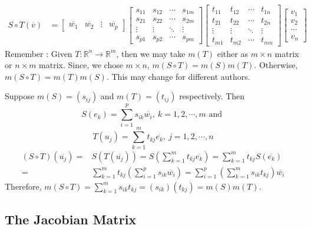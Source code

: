 \begin{commentary}
\begin{align*}
	S \circ T(\overline{v}) & = \begin{bmatrix} \overline{w_1} & \overline{w_2} & \vdots & \overline{w_p} \end{bmatrix} \begin{bmatrix} s_{11} & s_{12} & \cdots & s_{1m} \\ s_{21} & s_{22} & \cdots & s_{2m} \\ \vdots & \vdots & \ddots & \vdots \\ s_{p1} & s_{p2} & \cdots & s_{pm} \end{bmatrix} \begin{bmatrix} t_{11} & t_{12} & \cdots & t_{1n} \\ t_{21} & t_{22} & \cdots & t_{2n} \\ \vdots & \vdots & \ddots & \vdots \\ t_{m1} & t_{m2} & \cdots & t_{mn} \end{bmatrix} \begin{bmatrix} v_1 \\ v_2 \\ \cdots \\ v_n  \end{bmatrix} 
\end{align*}
	Remember : Given $T : \mathbb{R}^n \to \mathbb{R}^m$, then we may take $m(T)$ either as $m \times n$ matrix or $n \times m$ matrix. Since, we chose $m \times n$, $m(S \circ T) = m(S)m(T)$. Otherwise, $m(S \circ T) = m(T)m(S)$. This may change for different authors.\\
\end{commentary}

	Suppose $m(S) = (s_{ij})$ and $m(T) = (t_{ij})$ respectively. Then
	\[ S(e_k) = \sum_{i=1}^p s_{ik} \overline{w_i},\ k=1,2,\cdots,m \text{ and }\]
	\[ T(u_j) = \sum_{k=1}^m t_{kj} \overline{e_k},\ j=1,2,\cdots,n \]
	\begin{align*}
		(S \circ T)(\overline{u_j}) = & S(T(\overline{u_j})) = S\left(\sum_{k=1}^m t_{kj}\overline{e_k}\right) = \sum_{k=1}^m t_{kj}S(\overline{e_k}) \\ 
		= & \sum_{k=1}^m t_{kj}\left( \sum_{i=1}^p s_{ik} \overline{w_i}\right) = \sum_{i=1}^p \left(\sum_{k=1}^m s_{ik}t_{kj}\right)\overline{w_i}
	\end{align*}
	Therefore, $m(S \circ T) = \sum_{k=1}^m s_{ik}t_{kj} = (s_{ik})(t_{kj}) =  m(S)m(T)$.

\subsection{The Jacobian Matrix}

